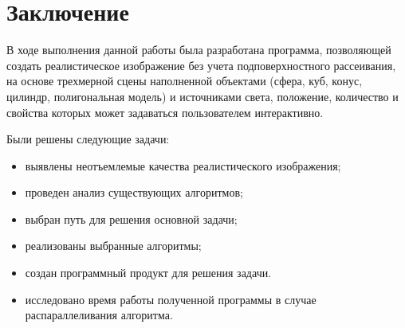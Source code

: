 \section*{Заключение}

В ходе выполнения данной работы была разработана программа, позволяющей создать
реалистическое изображение без учета подповерхностного рассеивания, на основе
трехмерной сцены наполненной объектами (сфера, куб, конус, цилиндр,
полигональная модель) и источниками света, положение, количество и свойства
которых может задаваться пользователем интерактивно.

Были решены следующие задачи:
\begin{itemize}
    \item выявлены неотъемлемые качества реалистического изображения;
    \item проведен анализ существующих алгоритмов;
    \item выбран путь для решения основной задачи;
    \item реализованы выбранные алгоритмы;
    \item создан программный продукт для решения задачи.
    \item исследовано время работы полученной программы в случае
          распараллеливания алгоритма.
\end{itemize}

